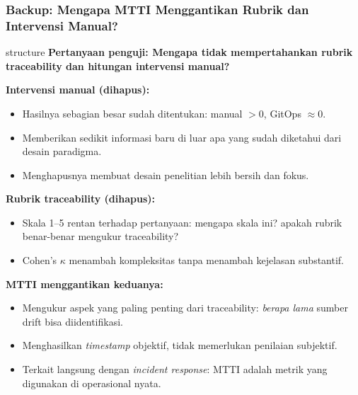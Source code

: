 {
\usebackgroundtemplate{\backgroundcontent}
\begin{frame}
    \frametitle{Backup: Mengapa MTTI Menggantikan Rubrik dan Intervensi Manual?}
    \vspace{0.02cm}
    \small
    \begin{beamercolorbox}[wd=\textwidth, sep=0.20cm, center, rounded=true]{structure}
        \small\bfseries Pertanyaan penguji: Mengapa tidak mempertahankan rubrik traceability dan hitungan intervensi manual?
    \end{beamercolorbox}
    \vspace{0.08cm}
    \textbf{Intervensi manual (dihapus):}
    \begin{itemize}
        \item Hasilnya sebagian besar sudah ditentukan: manual $> 0$, GitOps $\approx 0$.
        \item Memberikan sedikit informasi baru di luar apa yang sudah diketahui dari desain paradigma.
        \item Menghapusnya membuat desain penelitian lebih bersih dan fokus.
    \end{itemize}
    \vspace{0.06cm}
    \textbf{Rubrik traceability (dihapus):}
    \begin{itemize}
        \item Skala 1--5 rentan terhadap pertanyaan: mengapa skala ini? apakah rubrik benar-benar mengukur traceability?
        \item Cohen's $\kappa$ menambah kompleksitas tanpa menambah kejelasan substantif.
    \end{itemize}
    \vspace{0.06cm}
    \textbf{MTTI menggantikan keduanya:}
    \begin{itemize}
        \item Mengukur aspek yang paling penting dari traceability: \textit{berapa lama} sumber drift bisa diidentifikasi.
        \item Menghasilkan \textit{timestamp} objektif, tidak memerlukan penilaian subjektif.
        \item Terkait langsung dengan \textit{incident response}: MTTI adalah metrik yang digunakan di operasional nyata.
    \end{itemize}
\end{frame}
}

